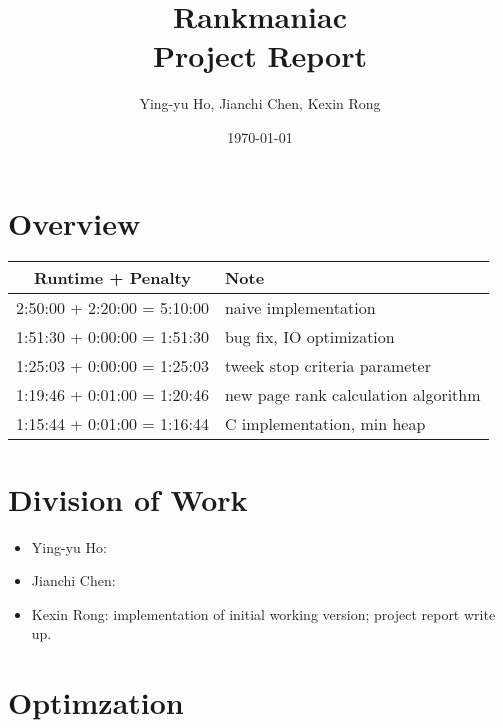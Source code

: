 \documentclass[12pt]{article}
\newcommand{\course}[2]{\def\courseName{#1} \def\sectName{#2}}
\newcommand{\assn}[1]{\def\assnName{#1}}
\begin{document}
\course{Rankmaniac}{}
\assn{Project Report}
\date{\today}
\title{\courseName \sectName \\ \assnName}
\author{Ying-yu Ho, Jianchi Chen, Kexin Rong}
\maketitle

\thispagestyle{empty}

\section{Overview}
\begin{center}
    \begin{tabular}{ | c | l | }
    \hline
    \textbf{Runtime + Penalty} & \textbf{Note} \\ \hline
    2:50:00 + 2:20:00 = 5:10:00 & naive implementation \\ 
    1:51:30  +  0:00:00  =  1:51:30 & bug fix, IO optimization \\
    1:25:03  +  0:00:00  =  1:25:03 & tweek stop criteria parameter \\
    1:19:46  +  0:01:00  =  1:20:46 & new page rank calculation algorithm\\
    1:15:44  +  0:01:00  =  1:16:44 & C implementation, min heap\\
    \hline
    \end{tabular}
\end{center}


\section{Division of Work}
\begin{itemize}
\item Ying-yu Ho:
\item Jianchi Chen:
\item Kexin Rong: implementation of initial working version; project report write up. 
\end{itemize}

\section{Optimzation}
\end{document}
